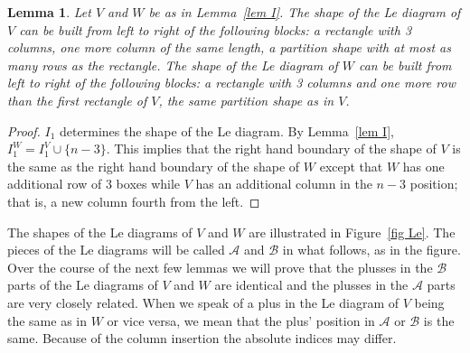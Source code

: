 \documentclass[11pt]{article}
\newtheorem{lem}[thm]{Lemma}
\theoremstyle{remark}
\theoremstyle{definition}
\begin{document}
\begin{lem}\label{lem shape}
  Let $V$ and $W$ be as in Lemma~\ref{lem I}.
  The shape of the Le diagram of $V$ can be built from left to right of the following blocks: a rectangle with 3 columns, one more column of the same length, a partition shape with at most as many rows as the rectangle.
  The shape of the Le diagram of $W$ can be built from left to right of the following blocks: a rectangle with 3 columns and one more row than the first rectangle of $V$, the same partition shape as in $V$.
\end{lem}

\begin{proof}
  $I_1$ determines the shape of the Le diagram.
  By Lemma~\ref{lem I}, $I_1^{W} = I_1^{V}\cup \{n-3\}$.  This implies that the right hand boundary of the shape of $V$ is the same as the right hand boundary of the shape of $W$ except that $W$ has one additional row of 3 boxes while $V$ has an additional column in the $n-3$ position; that is, a new column fourth from the left.
\end{proof}

The shapes of the Le diagrams of $V$ and $W$ are illustrated in Figure~\ref{fig Le}.  The pieces of the Le diagrams will be called $\mathcal{A}$ and $\mathcal{B}$ in what follows, as in the figure.  Over the course of the next few lemmas we will prove that the plusses in the $\mathcal{B}$ parts of the Le diagrams of $V$ and $W$ are identical and the plusses in the $\mathcal{A}$ parts are very closely related.  When we speak of a plus in the Le diagram of $V$ being the same as in $W$ or vice versa, we mean that the plus' position in $\mathcal{A}$ or $\mathcal{B}$ is the same.  Because of the column insertion the absolute indices may differ.
\end{document}
